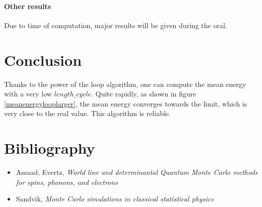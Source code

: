 \documentclass[a4paper,12pt]{article}
\begin{document}
	\paragraph{Other results}
	Due to time of computation, major results will be given during the oral.
	\newline
	
	\newpage
	\section{Conclusion}
	Thanks to the power of the loop algorithm, one can compute the mean energy with a very low $length\_cycle$. Quite rapidly, as shown in figure \ref{meanenergylooplarger}, the mean energy converges towards the limit, which is very close to the real value. This algorithm is reliable.
	
	\section{Bibliography}
	\begin{itemize}[label=$\star$]
		\item Assaad, Evertz, \emph{World line and determinantal Quantum Monte Carlo methods for spins, phonons, and electrons}
		\item Sandvik, \emph{Monte Carlo simulations in classical statistical physics}
	\end{itemize} 
	
	
\end{document}
